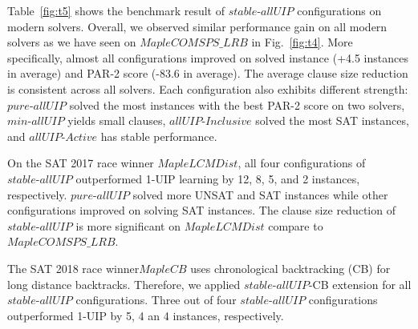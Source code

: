 \documentclass[runningheads]{llncs}
\newcommand{\allUip}{\textit{stable-allUIP}}
\newcommand{\allUipPure}{\textit{pure-allUIP}\xspace}
\newcommand{\allUipMin}{\textit{min-allUIP}\xspace}
\newcommand{\allUipAct}{\textit{allUIP-Active}}
\newcommand{\allUipIn}{\textit{allUIP-Inclusive}}
\newcommand{\MapleBase}{\textit{MapleCOMSPS\_LRB}}
\newcommand{\MapleSeven}{\textit{MapleLCMDist}}
\newcommand{\MapleEightShort}{\textit{MapleCB}}
\begin{document}
Table~\ref{fig:t5} shows the benchmark result of $\allUip$
configurations on modern solvers. Overall, we observed similar performance gain on all modern solvers as we have seen on $\MapleBase$ in Fig.~\ref{fig:t4}. More specifically, almost all configurations improved on solved instance (+4.5 instances in average) and PAR-2 score (-83.6 in average).  The average clause size reduction is consistent across all solvers. Each configuration also exhibits different strength: $\allUipPure$ solved the most instances with the best PAR-2 score on two solvers, $\allUipMin$ yields small clauses, $\allUipIn$ solved the most SAT instances, and $\allUipAct$ has stable performance.


On the SAT 2017 race winner $\MapleSeven$, all four configurations of
$\allUip$ outperformed 1-UIP learning by 12, 8, 5, and 2 instances, respectively. $\allUipPure$ solved
more UNSAT and SAT instances while other configurations improved on
solving SAT instances. The clause size reduction of $\allUip$ is more significant on $\MapleSeven$ compare to $\MapleBase$. 

The SAT 2018 race winner$\MapleEightShort$ uses chronological backtracking (CB) for long distance backtracks. Therefore, we applied $\allUip$-CB extension for all $\allUip$ configurations.  Three out of four $\allUip$ configurations outperformed 1-UIP by 5, 4 an 4 instances,
respectively. 

\end{document}
